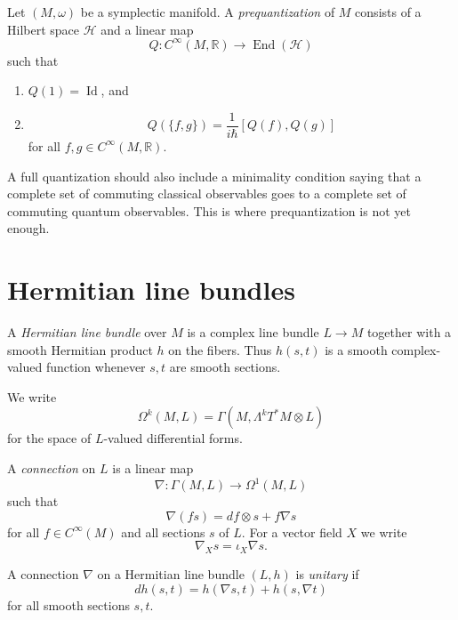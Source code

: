 \begin{definition}
\label{definition-dirac-prequantization}
Let $(M,\omega)$ be a symplectic manifold.
A {\it prequantization} of $M$ consists of a
Hilbert space $\mathcal H$ and a linear map
$$
Q:C^{\infty}(M,\mathbb R)\longrightarrow
\operatorname{End}(\mathcal H)
$$
such that
\begin{enumerate}
\item $Q(1)=\operatorname{Id}$, and
\item
$$
Q(\{f,g\})=\frac{1}{i\hbar}[Q(f),Q(g)]
$$
for all $f,g\in C^{\infty}(M,\mathbb R)$.
\end{enumerate}
\end{definition}

\noindent
A full quantization should also include a
minimality condition saying that a complete
set of commuting classical observables goes
to a complete set of commuting quantum
observables.  This is where
prequantization is
not yet enough.

\section{Hermitian line bundles}
\label{section-hermitian-line-bundles}

\begin{definition}
\label{definition-hermitian-line-bundle}
A {\it Hermitian line bundle} over $M$ is a
complex line bundle $L\to M$ together with a
smooth Hermitian product $h$ on the fibers.
Thus $h(s,t)$ is a smooth complex-valued
function whenever $s,t$ are smooth sections.
\end{definition}

\noindent
We write
$$
\Omega^k(M,L)=
\Gamma(M,\Lambda^kT^*M\otimes L)
$$
for the space of $L$-valued differential
forms.

\begin{definition}
\label{definition-connection-line-bundle}
A {\it connection} on $L$ is a linear map
$$
\nabla:\Gamma(M,L)\longrightarrow
\Omega^1(M,L)
$$
such that
$$
\nabla(fs)=df\otimes s+f\nabla s
$$
for all $f\in C^{\infty}(M)$ and all sections
$s$ of $L$.
For a vector field $X$ we write
$$
\nabla_Xs=\iota_X\nabla s.
$$
\end{definition}

\begin{definition}
\label{definition-unitary-connection}
A connection $\nabla$ on a Hermitian line
bundle $(L,h)$ is {\it unitary} if
$$
dh(s,t)=h(\nabla s,t)+h(s,\nabla t)
$$
for all smooth sections $s,t$.
\end{definition}

